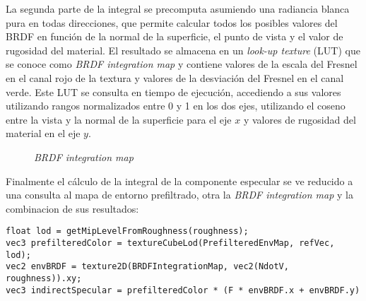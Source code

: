 
        La segunda parte de la integral se precomputa asumiendo una radiancia blanca pura en todas direcciones, que permite calcular
        todos los posibles valores del BRDF en funci\'on de la normal de la superficie, el punto de vista y el valor de rugosidad del material.
        El resultado se almacena en un \textit{look-up texture} (LUT) que se conoce como \textit{BRDF integration map} y contiene
        valores de la escala del Fresnel en el canal rojo de la textura y valores de la desviaci\'on del Fresnel en el canal verde.
        Este LUT se consulta en tiempo de ejecuci\'on, accediendo a sus valores utilizando rangos normalizados entre
        0 y 1 en los dos ejes, utilizando el coseno entre la vista y la normal de la superficie para el eje $x$ y valores de rugosidad
        del material en el eje $y$.

        \begin{figure}[H]
            \vspace{0.5cm}
            \centering
            \caption{\textit{BRDF integration map}}
        \end{figure}
        \singlespacing

        
        Finalmente el c\'alculo de la integral de la componente especular se ve reducido a una consulta al mapa de entorno prefiltrado,
        otra la \textit{BRDF integration map} y la combinacion de sus resultados:

        \singlespacing
        \begin{lstlisting}[caption=C\'alculo de la componente especular debida al entorno]
float lod = getMipLevelFromRoughness(roughness);
vec3 prefilteredColor = textureCubeLod(PrefilteredEnvMap, refVec, lod);
vec2 envBRDF = texture2D(BRDFIntegrationMap, vec2(NdotV, roughness)).xy;
vec3 indirectSpecular = prefilteredColor * (F * envBRDF.x + envBRDF.y) 
        \end{lstlisting}
        \singlespacing
        




    


